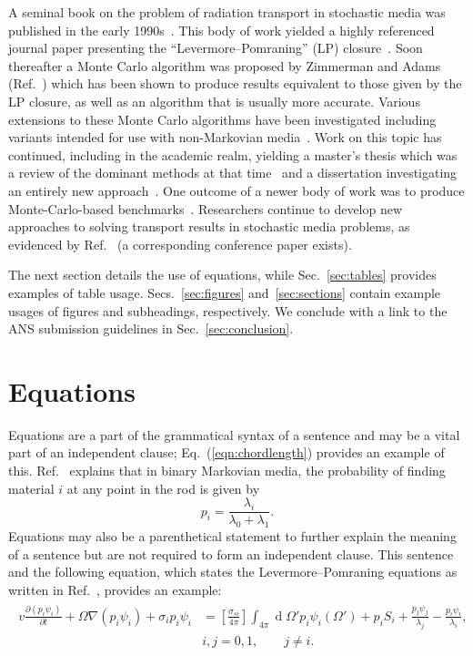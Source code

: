 \documentclass{article}                                                                           %
\DeclareMathOperator{\diff}{d}                                                                %
\begin{document}
A seminal book on the problem of radiation transport in stochastic media was published in the early 1990s~\cite{Pomraning1991book}.
This body of work yielded a highly referenced journal paper presenting the ``Levermore--Pomraning'' (LP) closure~\cite{AdamsJQSRT1989}.
Soon thereafter a Monte Carlo algorithm was proposed by Zimmerman and Adams (Ref.~\cite{ZimmermanANS1991}) which has been shown to produce results equivalent to those given by the LP closure, as well as an algorithm that is usually more accurate.
Various extensions to these Monte Carlo algorithms have been investigated including variants intended for use with non-Markovian media~\cite{DonovanNSE2003}.
Work on this topic has continued, including in the academic realm, yielding a master's thesis which was a review of the dominant methods at that time~\cite{Vasques2005thesis} and a dissertation investigating an entirely new approach~\cite{Fichtl2009dissertation}.
One outcome of a newer body of work was to produce Monte-Carlo-based benchmarks~\cite{BrantleyMC2009Incident}.
Researchers continue to develop new approaches to solving transport results in stochastic media problems, as evidenced by Ref.~\cite{PautzSAND2017AMClosurePres} (a corresponding conference paper exists).

The next section details the use of equations, while Sec.~\ref{sec:tables} provides examples of table usage.
Secs.~\ref{sec:figures} and~\ref{sec:sections} contain example usages of figures and subheadings, respectively.
We conclude with a link to the ANS submission guidelines in Sec.~\ref{sec:conclusion}.



\section{Equations}
\label{sec:equations}

Equations are a part of the grammatical syntax of a sentence and may be a vital part of an independent clause; Eq.~(\ref{eqn:chordlength}) provides an example of this.
Ref.~\cite{AdamsJQSRT1989} explains that in binary Markovian media, the probability of finding material \(i\) at any point in the rod is given by
\begin{equation}
  p_i = \frac{\lambda_i}{\lambda_0 + \lambda_1}.
  \label{eqn:chordlength}
\end{equation}
Equations may also be a parenthetical statement to further explain the meaning of a sentence but are not required to form an independent clause.
This sentence and the following equation, which states the Levermore--Pomraning equations as written in Ref.~\cite{AdamsJQSRT1989}, provides an example:
\begin{align}
\begin{split}
  v \frac{\partial(p_i \psi_i)}{\partial t} + \Omega \nabla(p_i \psi_i) + \sigma_i p_i \psi_i &= \left[ \frac{\sigma_{si}}{4\pi} \right] \int_{4\pi} \diff \Omega' p_i \psi_i(\Omega') + p_i S_i + \frac{p_j \psi_j}{\lambda_j} - \frac{p_i \psi_i}{\lambda_i}, \\ 
  & i, j = 0,1, \qquad j \neq i.
\end{split}
  \label{eqn:LPequations}
\end{align}
\end{document}
